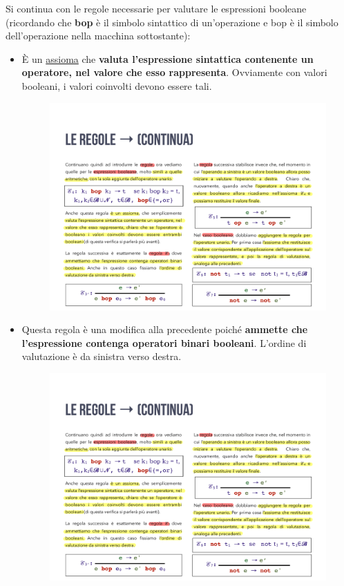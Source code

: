 \documentclass[a4paper]{article}
\begin{document}
	\noindent
	Si continua con le regole necessarie per valutare le espressioni booleane (ricordando che \textbf{bop} è il simbolo sintattico di un'operazione e bop è il simbolo dell'operazione nella macchina sottostante):
	\begin{itemize}
		\item È un \underline{assioma} che \textbf{valuta l'espressione sintattica contenente un operatore, nel valore che esso rappresenta}. Ovviamente con valori booleani, i valori coinvolti devono essere tali.
		\begin{figure}[!htp]
			\centering
			\includegraphics[width=.65\textwidth]{img/regola_transizione-4.pdf}
		\end{figure}
		
		\item Questa regola è una modifica alla precedente poiché \textbf{ammette che l'espressione contenga operatori binari booleani}. L'ordine di valutazione è da sinistra verso destra.
		\begin{figure}[!htp]
			\centering
			\includegraphics[width=.65\textwidth]{img/regola_transizione-3b.pdf}
		\end{figure}
		

\end{itemize}
\end{document}
